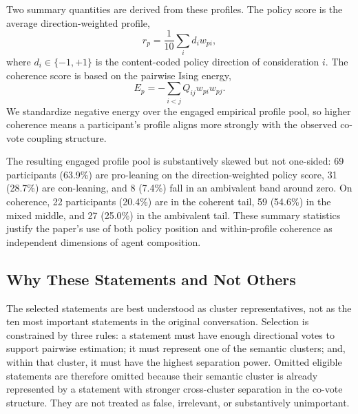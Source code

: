 Two summary quantities are derived from these profiles. The policy score is
the average direction-weighted profile,
\[
r_p = \frac{1}{10}\sum_i d_i w_{pi},
\]
where $d_i \in \{-1,+1\}$ is the content-coded policy direction of
consideration $i$. The coherence score is based on the pairwise Ising energy,
\[
E_p = -\sum_{i<j} Q_{ij}w_{pi}w_{pj}.
\]
We standardize negative energy over the engaged empirical profile pool, so
higher coherence means a participant's profile aligns more strongly with the
observed co-vote coupling structure.

The resulting engaged profile pool is substantively skewed but not one-sided:
69 participants (63.9\%) are pro-leaning on the direction-weighted policy
score, 31 (28.7\%) are con-leaning, and 8 (7.4\%) fall in an ambivalent band
around zero. On coherence, 22 participants (20.4\%) are in the coherent tail,
59 (54.6\%) in the mixed middle, and 27 (25.0\%) in the ambivalent tail. These
summary statistics justify the paper's use of both policy position and
within-profile coherence as independent dimensions of agent composition.

\subsection{Why These Statements and Not Others}

The selected statements are best understood as cluster representatives, not as
the ten most important statements in the original conversation. Selection is
constrained by three rules: a statement must have enough directional votes to
support pairwise estimation; it must represent one of the semantic clusters;
and, within that cluster, it must have the highest separation power. Omitted
eligible statements are therefore omitted because their semantic cluster is
already represented by a statement with stronger cross-cluster separation in
the co-vote structure. They are not treated as false, irrelevant, or
substantively unimportant.

